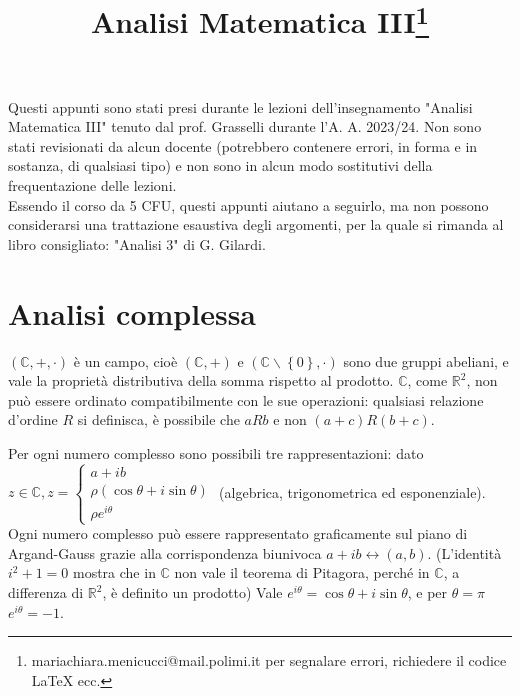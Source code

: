 \documentclass{article}
\title{Analisi Matematica III\footnote{mariachiara.menicucci@mail.polimi.it per segnalare errori, richiedere il codice LaTeX ecc.}}
\begin{document}
\maketitle
Questi appunti sono stati presi durante le lezioni dell'insegnamento "Analisi Matematica III" tenuto dal prof. Grasselli durante l'A. A. 2023/24. Non sono stati revisionati da alcun docente (potrebbero contenere errori, in forma e in sostanza, di qualsiasi tipo) e non sono in alcun modo sostitutivi della frequentazione delle lezioni. \\
Essendo il corso da 5 CFU, questi appunti aiutano a seguirlo, ma non possono considerarsi una trattazione esaustiva degli argomenti, per la quale si rimanda al libro consigliato: "Analisi 3" di G. Gilardi.
\newpage
\tableofcontents

\newpage

\section{Analisi complessa}

$\left( 
\mathbb{C}
,+,\cdot \right) $ \`{e} un campo, cio\`{e} $\left( 
\mathbb{C}
,+\right) $ e $\left( 
\mathbb{C}
\backslash \left\{ 0\right\} ,\cdot \right) $ sono due gruppi abeliani, e
vale la propriet\`{a} distributiva della somma rispetto al prodotto. $%
\mathbb{C}
$, come $%
\mathbb{R}
^{2}$, non pu\`{o} essere ordinato compatibilmente con le sue operazioni:
qualsiasi relazione d'ordine $R$ si definisca, \`{e} possibile che $aRb$ e
non $\left( a+c\right) R\left( b+c\right) $.

Per ogni numero complesso sono possibili tre rappresentazioni: dato $z\in 
\mathbb{C}
,z=\left\{ 
\begin{array}{c}
a+ib \\ 
\rho \left( \cos \theta +i\sin \theta \right) \\ 
\rho e^{i\theta }%
\end{array}%
\right. $ (algebrica, trigonometrica ed esponenziale). Ogni numero complesso
pu\`{o} essere rappresentato graficamente sul piano di Argand-Gauss grazie
alla corrispondenza biunivoca $a+ib\longleftrightarrow \left( a,b\right) $.
(L'identit\`{a} $i^{2}+1=0$ mostra che in $%
\mathbb{C}
$ non vale il teorema di Pitagora, perch\'{e} in $%
\mathbb{C}
$, a differenza di $%
\mathbb{R}
^{2}$, \`{e} definito un prodotto) Vale $e^{i\theta }=\cos \theta +i\sin
\theta $, e per $\theta =\pi $ $e^{i\theta }=-1$.
\end{document}
